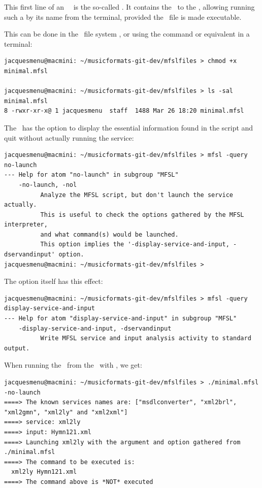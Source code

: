 This first line of an \mfslLang\ \script\ is the so-called . It contains the \filePath\ to the \mfslInterp, allowing running such a \script by its name from the terminal, provided the \script\ file is made executable.

This can be done in the \OS\ file system \GUI, or using the  command or equivalent in a terminal:
\begin{lstlisting}[language=Terminal]
jacquesmenu@macmini: ~/musicformats-git-dev/mfslfiles > chmod +x minimal.mfsl

jacquesmenu@macmini: ~/musicformats-git-dev/mfslfiles > ls -sal minimal.mfsl
8 -rwxr-xr-x@ 1 jacquesmenu  staff  1488 Mar 26 18:20 minimal.mfsl
\end{lstlisting}

The \mfslInterp\ has the  option to display the essential information found in the script and quit without actually running the service:
\begin{lstlisting}[language=Terminal]
jacquesmenu@macmini: ~/musicformats-git-dev/mfslfiles > mfsl -query no-launch
--- Help for atom "no-launch" in subgroup "MFSL"
    -no-launch, -nol
          Analyze the MFSL script, but don't launch the service actually.
          This is useful to check the options gathered by the MFSL interpreter,
          and what command(s) would be launched.
          This option implies the '-display-service-and-input, -dservandinput' option.
jacquesmenu@macmini: ~/musicformats-git-dev/mfslfiles >
\end{lstlisting}

The  option itself has this effect:
\begin{lstlisting}[language=Terminal]
jacquesmenu@macmini: ~/musicformats-git-dev/mfslfiles > mfsl -query display-service-and-input
--- Help for atom "display-service-and-input" in subgroup "MFSL"
    -display-service-and-input, -dservandinput
          Write MFSL service and input analysis activity to standard output.
\end{lstlisting}

When running the  \script\ from the \CLI\ with , we get:
\begin{lstlisting}[language=Terminal]
jacquesmenu@macmini: ~/musicformats-git-dev/mfslfiles > ./minimal.mfsl -no-launch
====> The known services names are: ["msdlconverter", "xml2brl", "xml2gmn", "xml2ly" and "xml2xml"]
====> service: xml2ly
====> input: Hymn121.xml
====> Launching xml2ly with the argument and option gathered from ./minimal.mfsl
====> The command to be executed is:
  xml2ly Hymn121.xml
====> The command above is *NOT* executed
\end{lstlisting}

